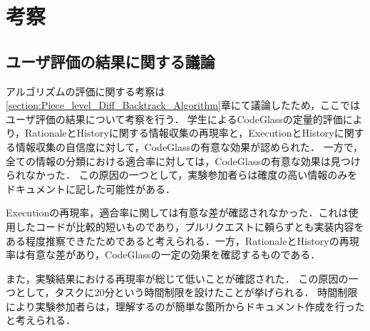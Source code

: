 \section{考察}
\subsection{ユーザ評価の結果に関する議論}

アルゴリズムの評価に関する考察は\ref{section:Piece_level_Diff_Backtrack_Algorithm}章にて議論したため，ここではユーザ評価の結果について考察を行う．
学生によるCodeGlassの定量的評価により，RationaleとHistoryに関する情報収集の再現率と，ExecutionとHistoryに関する情報収集の自信度に対して，CodeGlassの有意な効果が認められた．
一方で，全ての情報の分類における適合率に対しては，CodeGlassの有意な効果は見つけられなかった．
この原因の一つとして，実験参加者らは確度の高い情報のみをドキュメントに記した可能性がある．

Executionの再現率，適合率に関しては有意な差が確認されなかった．これは使用したコードが比較的短いものであり，プルリクエストに頼らずとも実装内容をある程度推察できたためであると考えられる．一方，RationaleとHistoryの再現率は有意な差があり，CodeGlassの一定の効果を確認するものである．

また，実験結果における再現率が総じて低いことが確認された．
この原因の一つとして，タスクに20分という時間制限を設けたことが挙げられる．
時間制限により実験参加者らは，理解するのが簡単な箇所からドキュメント作成を行ったと考えられる．








